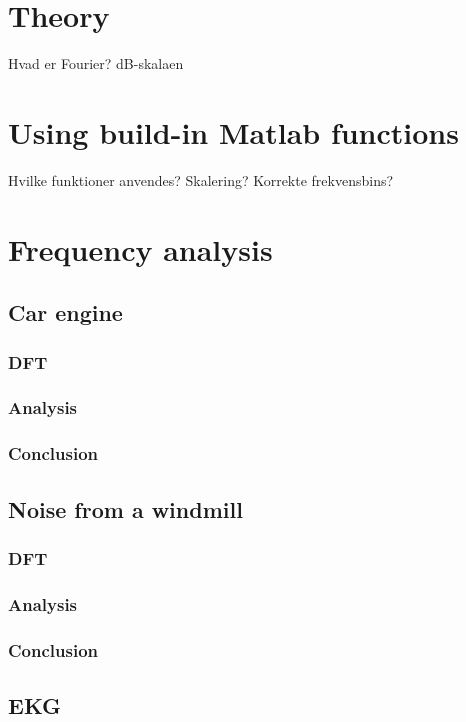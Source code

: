 \section{Theory}
Hvad er Fourier?
dB-skalaen

\section{Using build-in Matlab functions}
Hvilke funktioner anvendes?
Skalering?
Korrekte frekvensbins?

\section{Frequency analysis}
\subsection{Car engine}
\subsubsection{DFT}

\subsubsection{Analysis}

\subsubsection{Conclusion}

\subsection{Noise from a windmill}
\subsubsection{DFT}

\subsubsection{Analysis}

\subsubsection{Conclusion}

\subsection{EKG}
